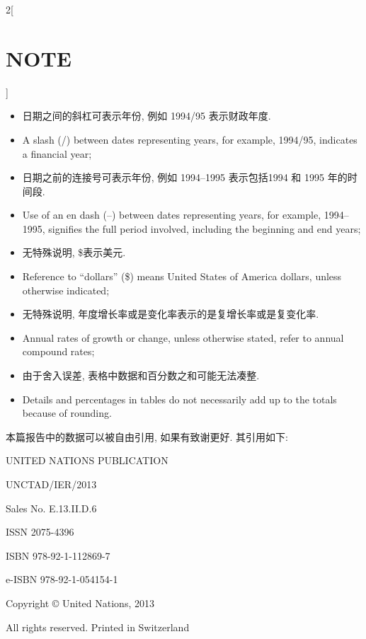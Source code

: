 \documentclass[a4paper, UTF8, 12pt]{article}
\begin{document}
\begin{paracol}{2}[\section{NOTE}]
\begin{itemize}
        \switchcolumn*
        \item 日期之间的斜杠可表示年份, 例如 1994/95 表示财政年度.
        \switchcolumn
        \item A slash (/) between dates representing years, for example, 1994/95, indicates a financial year; 
        
        \switchcolumn*
        \item 日期之前的连接号可表示年份, 例如 1994--1995 表示包括1994 和 1995 年的时间段.
        \switchcolumn
        \item Use of an en dash (–) between dates representing years, for example, 1994–1995, signifies the full period involved, including the beginning and end years;
        
        \switchcolumn*
        \item 无特殊说明, \$表示美元.
        \switchcolumn
        \item Reference to “dollars” (\$) means United States of America dollars, unless otherwise indicated; 
        
        \switchcolumn*
        \item 无特殊说明, 年度增长率或是变化率表示的是复增长率或是复变化率.
        \switchcolumn
        \item Annual rates of growth or change, unless otherwise stated, refer to annual compound rates;
        
        \switchcolumn*
        \item 由于舍入误差, 表格中数据和百分数之和可能无法凑整.
        \switchcolumn
        \item Details and percentages in tables do not necessarily add up to the totals because of rounding. 
    \end{itemize}

    \switchcolumn*
    本篇报告中的数据可以被自由引用, 如果有致谢更好. 其引用如下:
    
    \begin{center}
        UNITED NATIONS PUBLICATION 

        UNCTAD/IER/2013 

        Sales No. E.13.II.D.6

        ISSN 2075-4396 

        ISBN 978-92-1-112869-7 

        e-ISBN 978-92-1-054154-1 

        Copyright © United Nations, 2013

        All rights reserved. Printed in Switzerland
    \end{center}


\end{paracol}
\end{document}
